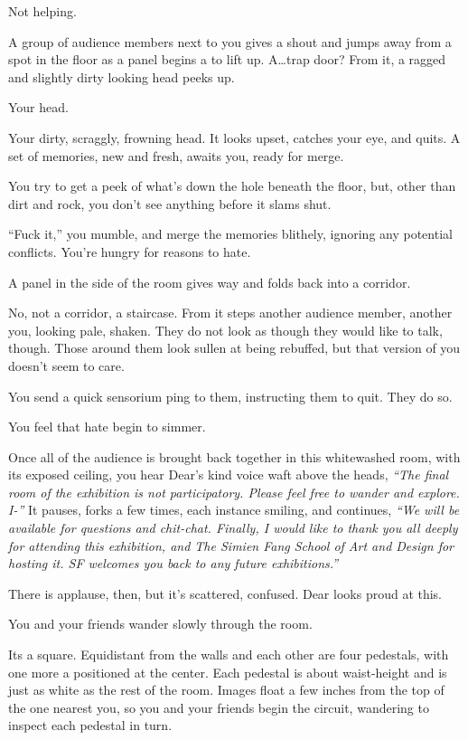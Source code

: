 Not helping.

A group of audience members next to you gives a shout and jumps away from a spot in the floor as a panel begins a to lift up. A\ldots{}trap door? From it, a ragged and slightly dirty looking head peeks up.

Your head.

Your dirty, scraggly, frowning head. It looks upset, catches your eye, and quits. A set of memories, new and fresh, awaits you, ready for merge.

You try to get a peek of what's down the hole beneath the floor, but, other than dirt and rock, you don't see anything before it slams shut.

``Fuck it,'' you mumble, and merge the memories blithely, ignoring any potential conflicts. You're hungry for reasons to hate.

A panel in the side of the room gives way and folds back into a corridor.

No, not a corridor, a staircase. From it steps another audience member, another you, looking pale, shaken. They do not look as though they would like to talk, though. Those around them look sullen at being rebuffed, but that version of you doesn't seem to care.

You send a quick sensorium ping to them, instructing them to quit. They do so.

You feel that hate begin to simmer.

Once all of the audience is brought back together in this whitewashed room, with its exposed ceiling, you hear Dear's kind voice waft above the heads, \emph{``The final room of the exhibition is not participatory. Please feel free to wander and explore. I-''} It pauses, forks a few times, each instance smiling, and continues, \emph{``We will be available for questions and chit-chat. Finally, I would like to thank you all deeply for attending this exhibition, and The Simien Fang School of Art and Design for hosting it. SF welcomes you back to any future exhibitions.''}

There is applause, then, but it's scattered, confused. Dear looks proud at this.

You and your friends wander slowly through the room.

Its a square. Equidistant from the walls and each other are four pedestals, with one more a positioned at the center. Each pedestal is about waist-height and is just as white as the rest of the room. Images float a few inches from the top of the one nearest you, so you and your friends begin the circuit, wandering to inspect each pedestal in turn.

